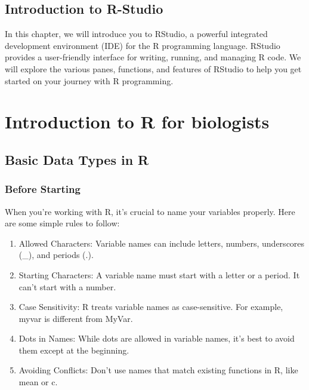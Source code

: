 \documentclass[
]{book}
\begin{document}
\hypertarget{introduction-to-r-studio}{%
\section{Introduction to R-Studio}\label{introduction-to-r-studio}}

In this chapter, we will introduce you to RStudio, a powerful integrated development environment (IDE) for the R programming language. RStudio provides a user-friendly interface for writing, running, and managing R code. We will explore the various panes, functions, and features of RStudio to help you get started on your journey with R programming.

\hypertarget{introduction-to-r-for-biologists}{%
\chapter{Introduction to R for biologists}\label{introduction-to-r-for-biologists}}

\hypertarget{basic-data-types-in-r}{%
\section{Basic Data Types in R}\label{basic-data-types-in-r}}

\hypertarget{before-starting}{%
\subsection{Before Starting}\label{before-starting}}

When you're working with R, it's crucial to name your variables properly. Here are some simple rules to follow:

\begin{enumerate}
\def\labelenumi{\arabic{enumi}.}
\item
  Allowed Characters: Variable names can include letters, numbers, underscores (\_), and periods (.).
\item
  Starting Characters: A variable name must start with a letter or a period. It can't start with a number.
\item
  Case Sensitivity: R treats variable names as case-sensitive. For example, myvar is different from MyVar.
\item
  Dots in Names: While dots are allowed in variable names, it's best to avoid them except at the beginning.
\item
  Avoiding Conflicts: Don't use names that match existing functions in R, like mean or c.
\end{enumerate}
\end{document}

